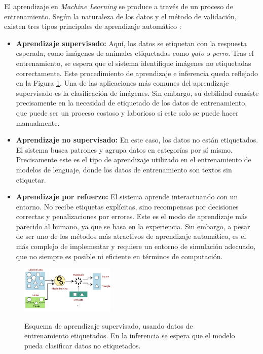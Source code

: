 El aprendizaje en \textit{Machine Learning} se produce a través de un proceso de entrenamiento. Según la naturaleza de los datos y el método de validación, existen tres tipos principales de aprendizaje automático \citep[p. ~38]{torresivinalsPythonDeepLearning2020}:

\begin{itemize}
    \item \textbf{Aprendizaje supervisado:} Aquí, los datos se etiquetan con la respuesta esperada, como imágenes de animales etiquetadas como \textit{gato} o \textit{perro}. Tras el entrenamiento, se espera que el sistema identifique imágenes no etiquetadas correctamente. Este procedimiento de aprendizaje e inferencia queda reflejado en la Figura \ref{fig:labeled_data_training}. Una de las aplicaciones más comunes del aprendizaje supervisado es la clasificación de imágenes. Sin embargo, su debilidad consiste precisamente en la necesidad de etiquetado de los datos de entrenamiento, que puede ser un proceso costoso y laborioso si este solo se puede hacer manualmente.
    
    \item \textbf{Aprendizaje no supervisado:} En este caso, los datos no están etiquetados. El sistema busca patrones y agrupa datos en categorías por sí mismo. Precisamente este es el tipo de aprendizaje utilizado en el entrenamiento de modelos de lenguaje, donde los datos de entrenamiento son textos sin etiquetar.
    
    \item \textbf{Aprendizaje por refuerzo:} El sistema aprende interactuando con un entorno. No recibe etiquetas explícitas, sino recompensas por decisiones correctas y penalizaciones por errores. Este es el modo de aprendizaje más parecido al humano, ya que se basa en la experiencia. Sin embargo, a pesar de ser uno de los métodos más atractivos de aprendizaje automático, es el más complejo de implementar y requiere un entorno de simulación adecuado, que no siempre es posible ni eficiente en términos de computación.
\end{itemize}

\begin{figure}[H]
    \caption[Esquema de aprendizaje supervisado]{Esquema de aprendizaje supervisado, usando datos de entrenamiento etiquetados. En la inferencia se espera que el modelo pueda clasificar datos no etiquetados.}
    \centering
    \includegraphics[width=0.4\textwidth]{./figuras/labeled_data_training.png}
    \label{fig:labeled_data_training}
\end{figure}


